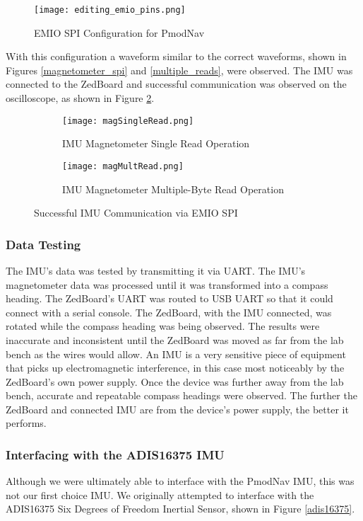 \begin{figure}[H]
	\centerline{\texttt{[image: editing\_emio\_pins.png]}}
	\caption{EMIO SPI Configuration for PmodNav}
	\label{emio_config}
\end{figure}

With this configuration a waveform similar to the correct waveforms, shown in Figures \ref{magnetometer_spi} and \ref{multiple_reads}, were observed. The IMU was connected to the ZedBoard and successful communication was observed on the oscilloscope, as shown in Figure \ref{OTPHJ}.

\begin{figure}[H] 
	\begin{subfigure}{1\textwidth}
	\centering
		\texttt{[image: magSingleRead.png]}
		\caption{IMU Magnetometer Single Read Operation}
	\end{subfigure}
	\begin{subfigure}{1\textwidth}
	\centering
		\texttt{[image: magMultRead.png]}
		\caption{IMU Magnetometer Multiple-Byte Read Operation}
	\end{subfigure}
	\caption{Successful IMU Communication via EMIO SPI}
	\label{OTPHJ}
\end{figure}

\subsubsection{Data Testing}
The IMU's data was tested by transmitting it via UART. The IMU's magnetometer data was processed until it was transformed into a compass heading. The ZedBoard's UART was routed to USB UART so that it could connect with a serial console. The ZedBoard, with the IMU connected, was rotated while the compass heading was being observed. The results were inaccurate and inconsistent until the ZedBoard was moved as far from the lab bench as the wires would allow. An IMU is a very sensitive piece of equipment that picks up electromagnetic interference, in this case most noticeably by the ZedBoard's own power supply. Once the device was further away from the lab bench, accurate and repeatable compass headings were observed. The further the ZedBoard and connected IMU are from the device's power supply, the better it performs.

\subsubsection{Interfacing with the ADIS16375 IMU}
Although we were ultimately able to interface with the PmodNav IMU, this was not our first choice IMU. We originally attempted to interface with the ADIS16375 Six Degrees of Freedom Inertial Sensor, shown in Figure \ref{adis16375}.

